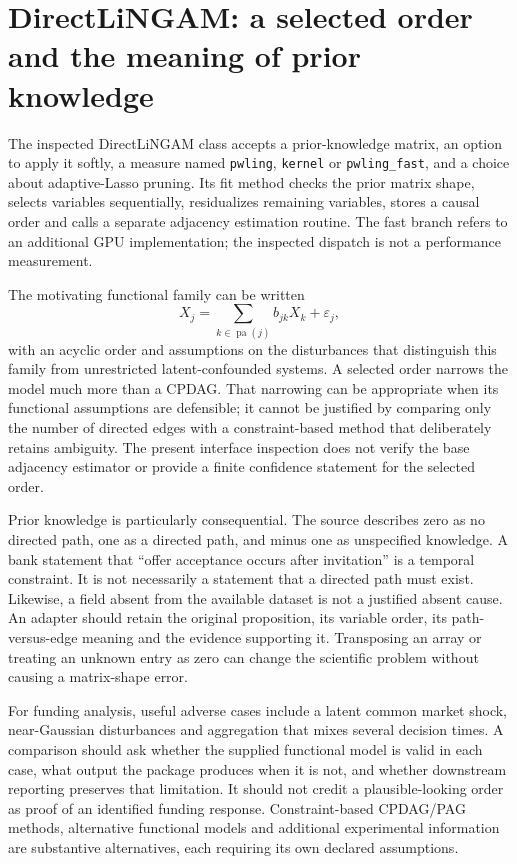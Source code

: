 \section{DirectLiNGAM: a selected order and the meaning of prior knowledge}

The inspected DirectLiNGAM class accepts a prior-knowledge matrix, an option to
apply it softly, a measure named \texttt{pwling}, \texttt{kernel} or
\texttt{pwling\_fast}, and a choice about adaptive-Lasso pruning. Its fit method
checks the prior matrix shape, selects variables sequentially, residualizes
remaining variables, stores a causal order and calls a separate adjacency
estimation routine. The fast branch refers to an additional GPU implementation;
the inspected dispatch is not a performance measurement. \cite{v13_sw_lingam}

The motivating functional family can be written
\[
 X_j=\sum_{k\in\operatorname{pa}(j)}b_{jk}X_k+\varepsilon_j,
\]
with an acyclic order and assumptions on the disturbances that distinguish this
family from unrestricted latent-confounded systems. A selected order narrows the
model much more than a CPDAG. That narrowing can be appropriate when its
functional assumptions are defensible; it cannot be justified by comparing only
the number of directed edges with a constraint-based method that deliberately
retains ambiguity. The present interface inspection does not verify the base
adjacency estimator or provide a finite confidence statement for the selected
order.

Prior knowledge is particularly consequential. The source describes zero as no
directed path, one as a directed path, and minus one as unspecified knowledge.
A bank statement that ``offer acceptance occurs after invitation'' is a temporal
constraint. It is not necessarily a statement that a directed path must exist.
Likewise, a field absent from the available dataset is not a justified absent
cause. An adapter should retain the original proposition, its variable order,
its path-versus-edge meaning and the evidence supporting it. Transposing an
array or treating an unknown entry as zero can change the scientific problem
without causing a matrix-shape error.

For funding analysis, useful adverse cases include a latent common market shock,
near-Gaussian disturbances and aggregation that mixes several decision times.
A comparison should ask whether the supplied functional model is valid in each
case, what output the package produces when it is not, and whether downstream
reporting preserves that limitation. It should not credit a plausible-looking
order as proof of an identified funding response. Constraint-based CPDAG/PAG
methods, alternative functional models and additional experimental information
are substantive alternatives, each requiring its own declared assumptions.

